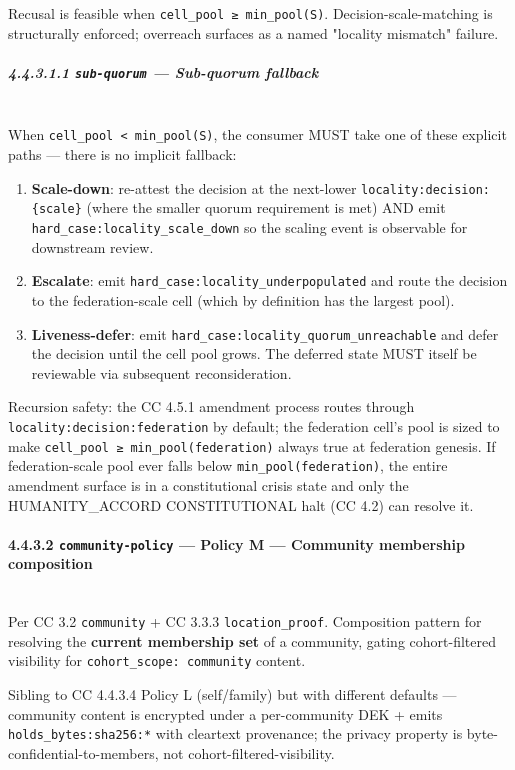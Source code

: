 \documentclass[11pt]{article}
\begin{document}
Recusal is feasible when \texttt{cell\_pool ≥ min\_pool(S)}. Decision-scale-matching is structurally enforced; overreach surfaces as a named "locality mismatch" failure.


\subparagraph{4.4.3.1.1 \texttt{sub-quorum} — Sub-quorum fallback}\mbox{}\\


When \texttt{cell\_pool < min\_pool(S)}, the consumer MUST take one of these explicit paths — there is no implicit fallback:


\begin{enumerate}\setlength\itemsep{0pt}
\item \textbf{Scale-down}: re-attest the decision at the next-lower \texttt{locality:decision:\{scale\}} (where the smaller quorum requirement is met) AND emit \texttt{hard\_case:locality\_scale\_down} so the scaling event is observable for downstream review.
\item \textbf{Escalate}: emit \texttt{hard\_case:locality\_underpopulated} and route the decision to the federation-scale cell (which by definition has the largest pool).
\item \textbf{Liveness-defer}: emit \texttt{hard\_case:locality\_quorum\_unreachable} and defer the decision until the cell pool grows. The deferred state MUST itself be reviewable via subsequent reconsideration.
\end{enumerate}


Recursion safety: the CC 4.5.1 amendment process routes through \texttt{locality:decision:federation} by default; the federation cell's pool is sized to make \texttt{cell\_pool ≥ min\_pool(federation)} always true at federation genesis. If federation-scale pool ever falls below \texttt{min\_pool(federation)}, the entire amendment surface is in a constitutional crisis state and only the HUMANITY\_ACCORD CONSTITUTIONAL halt (CC 4.2) can resolve it.


\paragraph{4.4.3.2 \texttt{community-policy} — Policy M — Community membership composition}\mbox{}\\


Per CC 3.2 \texttt{community} + CC 3.3.3 \texttt{location\_proof}. Composition pattern for resolving the \textbf{current membership set} of a community, gating cohort-filtered visibility for \texttt{cohort\_scope: community} content.


Sibling to CC 4.4.3.4 Policy L (self/family) but with different defaults — community content is encrypted under a per-community DEK + emits \texttt{holds\_bytes:sha256:*} with cleartext provenance; the privacy property is byte-confidential-to-members, not cohort-filtered-visibility.
\end{document}
